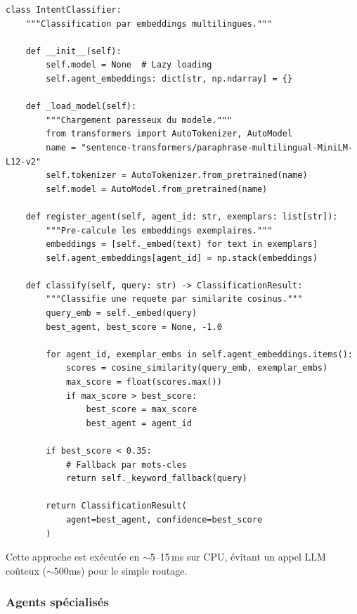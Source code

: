 \documentclass[12pt, a4paper]{article}
\newcommand{\acrshort}[1]{\MakeUppercase{#1}}
\begin{document}
\begin{lstlisting}[caption={Classifieur d'intention par embeddings}, label={lst:classifier}]
class IntentClassifier:
    """Classification par embeddings multilingues."""

    def __init__(self):
        self.model = None  # Lazy loading
        self.agent_embeddings: dict[str, np.ndarray] = {}

    def _load_model(self):
        """Chargement paresseux du modele."""
        from transformers import AutoTokenizer, AutoModel
        name = "sentence-transformers/paraphrase-multilingual-MiniLM-L12-v2"
        self.tokenizer = AutoTokenizer.from_pretrained(name)
        self.model = AutoModel.from_pretrained(name)

    def register_agent(self, agent_id: str, exemplars: list[str]):
        """Pre-calcule les embeddings exemplaires."""
        embeddings = [self._embed(text) for text in exemplars]
        self.agent_embeddings[agent_id] = np.stack(embeddings)

    def classify(self, query: str) -> ClassificationResult:
        """Classifie une requete par similarite cosinus."""
        query_emb = self._embed(query)
        best_agent, best_score = None, -1.0

        for agent_id, exemplar_embs in self.agent_embeddings.items():
            scores = cosine_similarity(query_emb, exemplar_embs)
            max_score = float(scores.max())
            if max_score > best_score:
                best_score = max_score
                best_agent = agent_id

        if best_score < 0.35:
            # Fallback par mots-cles
            return self._keyword_fallback(query)

        return ClassificationResult(
            agent=best_agent, confidence=best_score
        )
\end{lstlisting}

Cette approche est exécutée en $\sim$5--15\,ms sur CPU, évitant un appel \acrshort{llm} coûteux ($\sim$500ms) pour le simple routage.

\subsubsection{Agents spécialisés}
\end{document}
